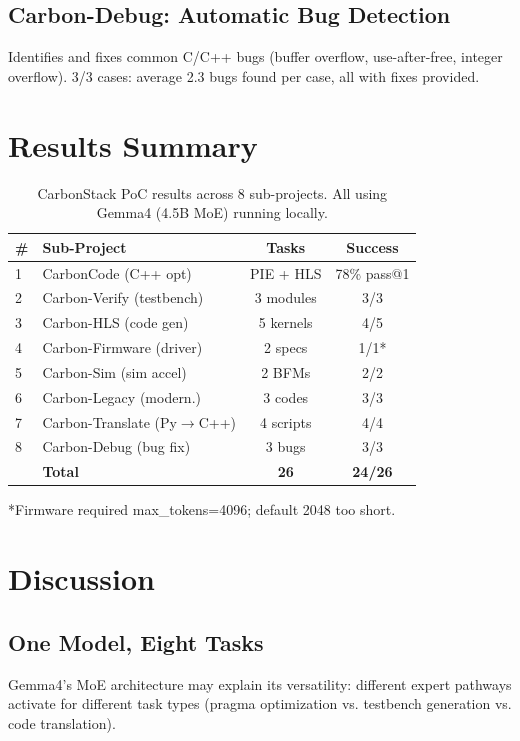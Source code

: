 \documentclass[conference]{IEEEtran}
\begin{document}
\subsection{Carbon-Debug: Automatic Bug Detection}
Identifies and fixes common C/C++ bugs (buffer overflow,
use-after-free, integer overflow). 3/3 cases: average 2.3 bugs
found per case, all with fixes provided.

\section{Results Summary}

\begin{table}[t]
\centering
\caption{CarbonStack PoC results across 8 sub-projects.
All using Gemma4 (4.5B MoE) running locally.}
\label{tab:poc}
\begin{tabular}{llcc}
\toprule
\textbf{\#} & \textbf{Sub-Project} & \textbf{Tasks} & \textbf{Success} \\
\midrule
1 & CarbonCode (C++ opt)    & PIE + HLS  & 78\% pass@1 \\
2 & Carbon-Verify (testbench) & 3 modules  & 3/3 \\
3 & Carbon-HLS (code gen)    & 5 kernels  & 4/5 \\
4 & Carbon-Firmware (driver)  & 2 specs    & 1/1* \\
5 & Carbon-Sim (sim accel)    & 2 BFMs     & 2/2 \\
6 & Carbon-Legacy (modern.)   & 3 codes    & 3/3 \\
7 & Carbon-Translate (Py$\to$C++) & 4 scripts & 4/4 \\
8 & Carbon-Debug (bug fix)    & 3 bugs     & 3/3 \\
\midrule
  & \textbf{Total}           & \textbf{26} & \textbf{24/26} \\
\bottomrule
\end{tabular}
\vspace{1mm}
\footnotesize{*Firmware required max\_tokens=4096; default 2048 too short.}
\end{table}

\section{Discussion}

\subsection{One Model, Eight Tasks}
Gemma4's MoE architecture may explain its versatility: different
expert pathways activate for different task types (pragma optimization
vs. testbench generation vs. code translation).
\end{document}
